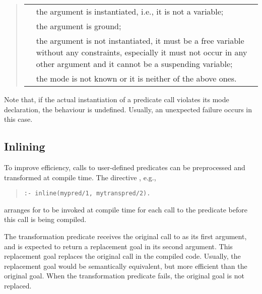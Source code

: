 \newlength{\firstColumn}
\newlength{\secondColumn}
\settowidth{\firstColumn}{\notation{++}}
\setlength{\secondColumn}{\textwidth}
\addtolength{\secondColumn}{-\firstColumn}
\addtolength{\secondColumn}{-7.5em}
\begin{quote}
\begin{tabular}[t]{l@{\hspace{1em}}p{\secondColumn}}
\notation{+}   & the argument is instantiated, i.e., it is not a variable;\\
\notation{++}  & the argument is ground;\\
\notation{-}   & the argument is not instantiated, it must be a free variable
                  without any constraints, especially it must not occur in any
                  other argument and it cannot be a suspending variable;\\
\notation{?}   &  the mode is not known or it is neither of the above ones.
\end{tabular}
\end{quote}

Note that, if the actual instantiation of a predicate call violates
its mode declaration, the behaviour is undefined.
Usually, an unexpected failure occurs in this case.

\subsection{Inlining}
To improve efficiency, calls to user-defined predicates can be
preprocessed and transformed at compile time.  The directive
, e.g.,
\begin{quote}
\begin{verbatim}
:- inline(mypred/1, mytranspred/2).
\end{verbatim}
\end{quote}
arranges for  to be invoked at compile time for each
call to the predicate  before this call is being compiled.

The transformation predicate receives the original call to 
as its first argument, and is expected to return a replacement goal
in its second argument. This replacement goal replaces the original
call in the compiled code. Usually, the replacement goal would be
semantically equivalent, but more efficient than the original goal.
When the transformation predicate fails, the original goal is not
replaced.

